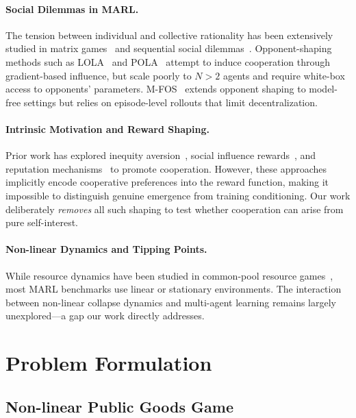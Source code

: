 \documentclass{article}
\begin{document}
\paragraph{Social Dilemmas in MARL.}
The tension between individual and collective rationality has been extensively studied in matrix games~\cite{leibo2017multi} and sequential social dilemmas~\cite{hughes2018inequity}.
Opponent-shaping methods such as LOLA~\cite{foerster2018learning} and POLA~\cite{zhao2022proximal} attempt to induce cooperation through gradient-based influence, but scale poorly to $N > 2$ agents and require white-box access to opponents' parameters.
M-FOS~\cite{lu2022model} extends opponent shaping to model-free settings but relies on episode-level rollouts that limit decentralization.

\paragraph{Intrinsic Motivation and Reward Shaping.}
Prior work has explored inequity aversion~\cite{hughes2018inequity}, social influence rewards~\cite{jaques2019social}, and reputation mechanisms~\cite{anastassacos2020cooperation} to promote cooperation.
However, these approaches implicitly encode cooperative preferences into the reward function, making it impossible to distinguish genuine emergence from training conditioning.
Our work deliberately \emph{removes} all such shaping to test whether cooperation can arise from pure self-interest.

\paragraph{Non-linear Dynamics and Tipping Points.}
While resource dynamics have been studied in common-pool resource games~\cite{ostrom1990governing}, most MARL benchmarks use linear or stationary environments.
The interaction between non-linear collapse dynamics and multi-agent learning remains largely unexplored---a gap our work directly addresses.

\section{Problem Formulation}
\label{sec:formulation}

\subsection{Non-linear Public Goods Game}
\end{document}
